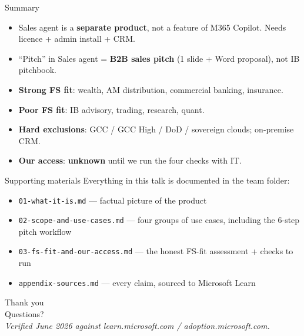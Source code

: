 \documentclass[11pt,aspectratio=169]{beamer}
\newcommand{\hl}[1]{\textbf{\textcolor{accentteal}{#1}}}
\begin{document}
\begin{frame}{Summary}
  \begin{itemize}
    \item Sales agent is a \hl{separate product}, not a feature of M365 Copilot. Needs licence + admin install + CRM.
    \item ``Pitch'' in Sales agent = \hl{B2B sales pitch} (1 slide + Word proposal), not IB pitchbook.
    \item \textbf{Strong FS fit}: wealth, AM distribution, commercial banking, insurance.
    \item \textbf{Poor FS fit}: IB advisory, trading, research, quant.
    \item \textbf{Hard exclusions}: GCC / GCC High / DoD / sovereign clouds; on-premise CRM.
    \item \textbf{Our access}: \hl{unknown} until we run the four checks with IT.
  \end{itemize}
\end{frame}

\begin{frame}{Supporting materials}
  Everything in this talk is documented in the team folder:
  \begin{itemize}
    \item \texttt{01-what-it-is.md} --- factual picture of the product
    \item \texttt{02-scope-and-use-cases.md} --- four groups of use cases, including the 6-step pitch workflow
    \item \texttt{03-fs-fit-and-our-access.md} --- the honest FS-fit assessment + checks to run
    \item \texttt{appendix-sources.md} --- every claim, sourced to Microsoft Learn
  \end{itemize}
\end{frame}

\begin{frame}[plain]
  \begin{center}
    {\Huge Thank you}\\[1.2em]
    {\Large Questions?}\\[2.4em]
    \small \textit{Verified June 2026 against learn.microsoft.com / adoption.microsoft.com.}
  \end{center}
\end{frame}
\end{document}
